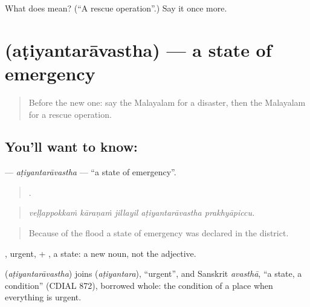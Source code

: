 \begin{tcolorbox}[breakable,colback=teal!4,colframe=teal!35!black,title={Before you move on}]
What does  mean? (\textquotedblleft{}A rescue operation\textquotedblright{}.) Say it once more.
\end{tcolorbox}
\section[\texorpdfstring{\ml{അടിയന്തരാവസ്ഥ} (aṭiyantarāvastha)}{അടിയന്തരാവസ്ഥ (aṭiyantarāvastha)}]{ (aṭiyantarāvastha) — a state of emergency}

\label{lesson:ML-C374-atiyantaravastha}



\begin{quote}
Before the new one: say the Malayalam for a disaster, then the Malayalam for a rescue operation.
\end{quote}

\subsection*{You'll want to know: }
\textbf{} — \emph{aṭiyantarāvastha} — \textquotedblleft{}a state of emergency\textquotedblright{}.

\begin{quote}
    .
\end{quote}

\begin{quote}
\emph{veḷḷappokkaṁ kāraṇaṁ jillayil aṭiyantarāvastha prakhyāpiccu.}
\end{quote}

\begin{quote}
Because of the flood a state of emergency was declared in the district.
\end{quote}

, urgent, + , a state: a new noun, not the adjective.

\begin{cousinweb}
\textbf{} (\emph{aṭiyantarāvastha}) joins  (\emph{aṭiyantara}), \textquotedblleft{}urgent\textquotedblright{}, and Sanskrit \emph{avasthā}, \textquotedblleft{}a state, a condition\textquotedblright{} (CDIAL 872), borrowed whole: the condition of a place when everything is urgent.
\end{cousinweb}

